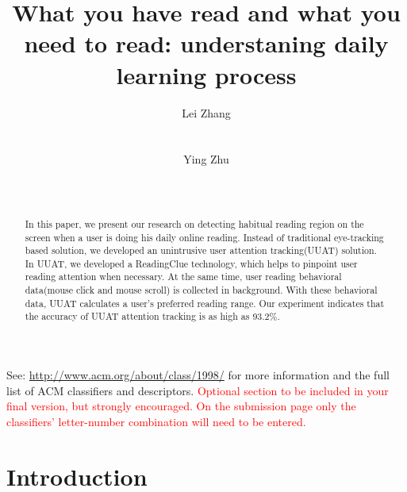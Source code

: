 \documentclass{sigchi}
\begin{document}
\title{What you have read  and what you need to read: understaning daily learning process}

\author{
  \alignauthor Lei Zhang\\
    \\
    \\
  \alignauthor Ying Zhu\\
    \\
    \\
}

\maketitle

\begin{abstract}

In this paper, we present our research on detecting habitual reading region 
on the screen when a user is doing his daily online reading. Instead of traditional eye-tracking based solution,
we developed an unintrusive user attention tracking(UUAT) solution. In UUAT, we developed a ReadingClue 
technology,  which helps to pinpoint user reading attention when necessary. At the same time, user reading behavioral data(mouse click and mouse scroll) is
collected in background. With these behavioral data, UUAT calculates a user's preferred reading range. Our experiment
indicates that the accuracy of UUAT attention tracking is as high as 93.2\%.





\end{abstract}



See: \url{http://www.acm.org/about/class/1998/}
for more information and the full list of ACM classifiers
and descriptors. \newline
\textcolor{red}{Optional section to be included in your final version, 
but strongly encouraged. On the submission page only the classifiers’ 
letter-number combination will need to be entered.}

\section{Introduction}
\end{document}

